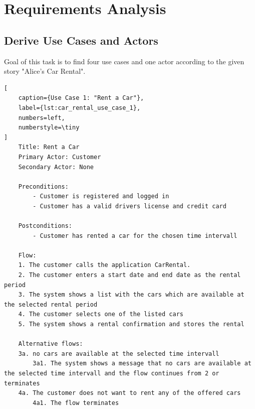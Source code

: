 \label{cha:requirements_analysis}

\section{Requirements Analysis}

\subsection{Derive Use Cases and Actors}
Goal of this task is to find four use cases and one actor according to the given story "Alice's Car Rental".

\begin{lstlisting}[
    caption={Use Case 1: "Rent a Car"},
    label={lst:car_rental_use_case_1},
    numbers=left,
    numberstyle=\tiny
]
    Title: Rent a Car
    Primary Actor: Customer
    Secondary Actor: None

    Preconditions:
        - Customer is registered and logged in
        - Customer has a valid drivers license and credit card

    Postconditions:
        - Customer has rented a car for the chosen time intervall

    Flow:
    1. The customer calls the application CarRental.
    2. The customer enters a start date and end date as the rental period
    3. The system shows a list with the cars which are available at the selected rental period
    4. The customer selects one of the listed cars
    5. The system shows a rental confirmation and stores the rental

    Alternative flows:
    3a. no cars are available at the selected time intervall
        3a1. The system shows a message that no cars are available at the selected time intervall and the flow continues from 2 or terminates
    4a. The customer does not want to rent any of the offered cars
        4a1. The flow terminates    
\end{lstlisting}



